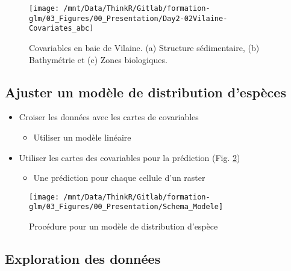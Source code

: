 \documentclass[french,a4paper]{article}
\providecommand{\tightlist}{%
  \setlength{\itemsep}{0pt}\setlength{\parskip}{0pt}}
\begin{document}
\begin{figure}[!h]

{\centering \texttt{[image: /mnt/Data/ThinkR/Gitlab/formation-glm/03\_Figures/00\_Presentation/Day2-02Vilaine-Covariates\_abc]} 

}

\caption{Covariables en baie de Vilaine. (a) Structure sédimentaire, (b) Bathymétrie et (c) Zones biologiques.}\label{fig:figCovariates}
\end{figure}

\hypertarget{ajuster-un-modele-de-distribution-despeces}{%
\subsection{Ajuster un modèle de distribution d'espèces}\label{ajuster-un-modele-de-distribution-despeces}}

\begin{itemize}
\tightlist
\item
  Croiser les données avec les cartes de covariables

  \begin{itemize}
  \tightlist
  \item
    Utiliser un modèle linéaire
  \end{itemize}
\item
  Utiliser les cartes des covariables pour la prédiction (Fig. \ref{fig:figProcedure})

  \begin{itemize}
  \tightlist
  \item
    Une prédiction pour chaque cellule d'un raster
  \end{itemize}
\end{itemize}



\begin{figure}[!h]

{\centering \texttt{[image: /mnt/Data/ThinkR/Gitlab/formation-glm/03\_Figures/00\_Presentation/Schema\_Modele]} 

}

\caption{Procédure pour un modèle de distribution d'espèce}\label{fig:figProcedure}
\end{figure}

\hypertarget{exploration-des-donnees}{%
\subsection{Exploration des données}\label{exploration-des-donnees}}
\end{document}
